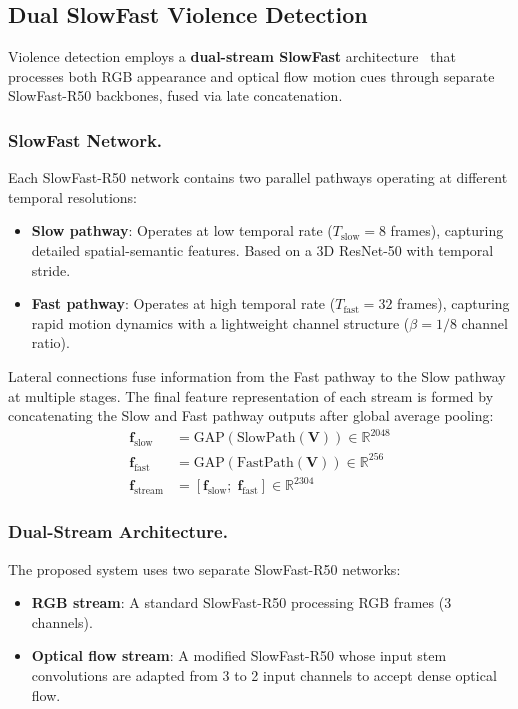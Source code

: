 \documentclass[11pt,a4paper]{article}
\newcommand{\R}{\mathbb{R}}
\begin{document}
\subsection{Dual SlowFast Violence Detection}
\label{subsec:violence}

Violence detection employs a \textbf{dual-stream SlowFast} architecture~\cite{slowfast} that processes both RGB appearance and optical flow motion cues through separate SlowFast-R50 backbones, fused via late concatenation.

\subsubsection{SlowFast Network.}
Each SlowFast-R50 network contains two parallel pathways operating at different temporal resolutions:
\begin{itemize}[nosep]
    \item \textbf{Slow pathway}: Operates at low temporal rate ($T_{\text{slow}} = 8$ frames), capturing detailed spatial-semantic features. Based on a 3D ResNet-50 with temporal stride.
    \item \textbf{Fast pathway}: Operates at high temporal rate ($T_{\text{fast}} = 32$ frames), capturing rapid motion dynamics with a lightweight channel structure ($\beta = 1/8$ channel ratio).
\end{itemize}

Lateral connections fuse information from the Fast pathway to the Slow pathway at multiple stages. The final feature representation of each stream is formed by concatenating the Slow and Fast pathway outputs after global average pooling:
\begin{align}
\mathbf{f}_{\text{slow}} &= \text{GAP}(\text{SlowPath}(\mathbf{V})) \in \R^{2048} \\
\mathbf{f}_{\text{fast}} &= \text{GAP}(\text{FastPath}(\mathbf{V})) \in \R^{256} \\
\mathbf{f}_{\text{stream}} &= [\mathbf{f}_{\text{slow}};\; \mathbf{f}_{\text{fast}}] \in \R^{2304}
\end{align}

\subsubsection{Dual-Stream Architecture.}
The proposed system uses two separate SlowFast-R50 networks:
\begin{itemize}[nosep]
    \item \textbf{RGB stream}: A standard SlowFast-R50 processing RGB frames (3 channels).
    \item \textbf{Optical flow stream}: A modified SlowFast-R50 whose input stem convolutions are adapted from 3 to 2 input channels to accept dense optical flow.
\end{itemize}
\end{document}
